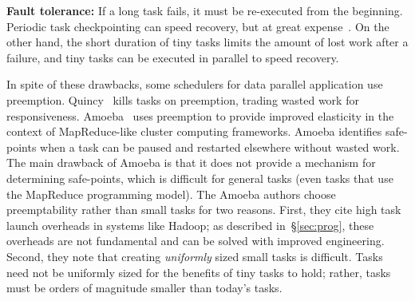 

\vspace{4pt}\noindent\textbf{Fault tolerance:}
If a long task fails, it must be re-executed from the beginning. Periodic task
checkpointing
can speed recovery, but at great expense~\cite{dunlap2002revirt}.
On the other hand, the short duration of
tiny tasks limits the amount of lost work after a failure, and tiny
tasks can be executed in parallel to speed recovery.

In spite of these drawbacks, some schedulers for data parallel application
use preemption.
Quincy~\cite{isard2009quincy} kills tasks on
preemption, trading wasted work for responsiveness.
Amoeba~\cite{ananthanarayanan2012true} uses preemption to provide improved elasticity in the context of 
MapReduce-like cluster computing frameworks. 
Amoeba identifies safe-points when a task can be
paused and restarted elsewhere without wasted work. The main drawback of Amoeba
is that it does not provide a mechanism for determining safe-points, which
is difficult for general tasks (even tasks that use the MapReduce programming
model).  The Amoeba authors choose preemptability rather than small tasks for
two reasons. First, they cite high task launch overheads in systems like
Hadoop; as described in~\S\ref{sec:prog}, these overheads are not fundamental
and can be solved with improved engineering. Second, they note that creating
\emph{uniformly} sized small tasks is difficult. Tasks need not be uniformly
sized for the benefits of tiny tasks to hold; rather, tasks must be orders of
magnitude smaller than today's tasks.

